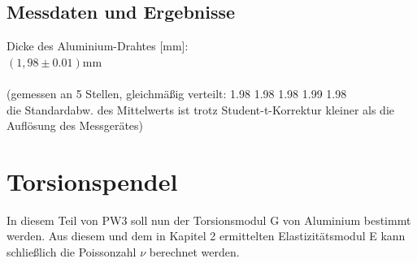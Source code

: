 \documentclass[12pt,a4paper]{article}
\begin{document}
\begin{multicols}{2}


\subsection{Messdaten und Ergebnisse}
Dicke des Aluminium-Drahtes [mm]:\\
$(1,98\pm 0.01)$mm\\
\\
(gemessen an 5 Stellen, gleichmäßig verteilt:
1.98
1.98
1.98
1.99
1.98\\
die Standardabw. des Mittelwerts ist trotz Student-t-Korrektur kleiner als die Auflösung des Messgerätes)\\




\section{Torsionspendel}
In diesem Teil von PW3 soll nun der Torsionsmodul G von Aluminium bestimmt werden. Aus diesem und dem in Kapitel 2 ermittelten Elastizitätsmodul E kann schließlich die Poissonzahl $\nu $ berechnet werden.\\

\end{multicols}
\end{document}
